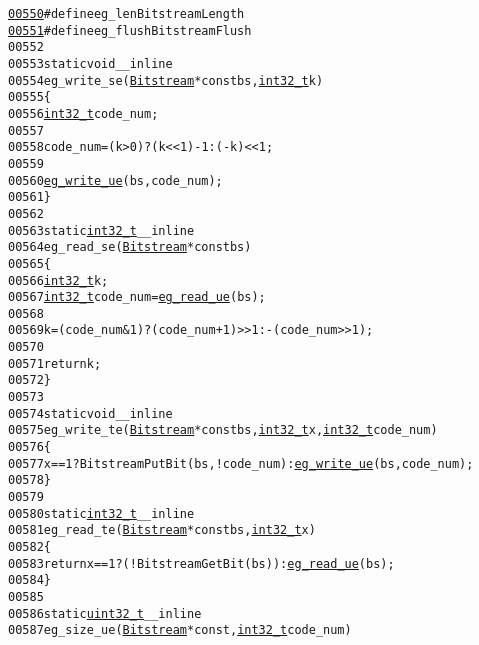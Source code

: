 \begin{footnotesize}
\begin{alltt}
\hypertarget{_bitstream_8h_source_l00550}{}\hyperlink{_bitstream_8h_a0a0225b45555db00cd5e082d335ee484}{00550} \textcolor{preprocessor}{}\textcolor{preprocessor}{#define eg\_len BitstreamLength}
\hypertarget{_bitstream_8h_source_l00551}{}\hyperlink{_bitstream_8h_a873dc424d3fab9c5610a476fe5a115f3}{00551} \textcolor{preprocessor}{}\textcolor{preprocessor}{#define eg\_flush BitstreamFlush}
00552 \textcolor{preprocessor}{}
00553 \textcolor{keyword}{static} \textcolor{keywordtype}{void} \_\_inline
00554 eg\_write\_se(\hyperlink{struct_bitstream}{Bitstream}* \textcolor{keyword}{const} bs, \hyperlink{_types_8h_a115ba3a1b24a8702355c5dbd61ce01e0}{int32_t} k)
00555 \{
00556     \hyperlink{_types_8h_a115ba3a1b24a8702355c5dbd61ce01e0}{int32_t} code\_num;
00557 
00558     code\_num = (k > 0) ? (k << 1) - 1 : (-k) << 1;
00559 
00560     \hyperlink{_bitstream_8h_a3619cb729f31034ff847cbfd0730fce9}{eg_write_ue}(bs, code\_num);    
00561 \}
00562 
00563 \textcolor{keyword}{static} \hyperlink{_types_8h_a115ba3a1b24a8702355c5dbd61ce01e0}{int32_t} \_\_inline
00564 eg\_read\_se(\hyperlink{struct_bitstream}{Bitstream}* \textcolor{keyword}{const} bs)
00565 \{
00566     \hyperlink{_types_8h_a115ba3a1b24a8702355c5dbd61ce01e0}{int32_t} k;
00567     \hyperlink{_types_8h_a115ba3a1b24a8702355c5dbd61ce01e0}{int32_t} code\_num = \hyperlink{_bitstream_8h_acad61027e3182912d2b9d95180d45250}{eg_read_ue}(bs);
00568     
00569     k = (code\_num & 1) ? (code\_num + 1) >> 1 : -(code\_num >> 1);
00570     
00571     \textcolor{keywordflow}{return} k;
00572 \}
00573 
00574 \textcolor{keyword}{static} \textcolor{keywordtype}{void} \_\_inline
00575 eg\_write\_te(\hyperlink{struct_bitstream}{Bitstream}* \textcolor{keyword}{const} bs, \hyperlink{_types_8h_a115ba3a1b24a8702355c5dbd61ce01e0}{int32_t} x, \hyperlink{_types_8h_a115ba3a1b24a8702355c5dbd61ce01e0}{int32_t} code\_num)
00576 \{
00577     x == 1 ? BitstreamPutBit(bs, !code\_num) : \hyperlink{_bitstream_8h_a3619cb729f31034ff847cbfd0730fce9}{eg_write_ue}(bs, code\_num);
00578 \}
00579 
00580 \textcolor{keyword}{static} \hyperlink{_types_8h_a115ba3a1b24a8702355c5dbd61ce01e0}{int32_t} \_\_inline
00581 eg\_read\_te(\hyperlink{struct_bitstream}{Bitstream}* \textcolor{keyword}{const} bs, \hyperlink{_types_8h_a115ba3a1b24a8702355c5dbd61ce01e0}{int32_t} x)
00582 \{
00583     \textcolor{keywordflow}{return} x == 1 ? (!BitstreamGetBit(bs)) : \hyperlink{_bitstream_8h_acad61027e3182912d2b9d95180d45250}{eg_read_ue}(bs);
00584 \}
00585 
00586 \textcolor{keyword}{static} \hyperlink{_types_8h_a04909d1366bb244ff2482beb51635f37}{uint32_t} \_\_inline
00587 eg\_size\_ue(\hyperlink{struct_bitstream}{Bitstream}* \textcolor{keyword}{const} , \hyperlink{_types_8h_a115ba3a1b24a8702355c5dbd61ce01e0}{int32_t} code\_num)

\end{alltt}
\end{footnotesize}
